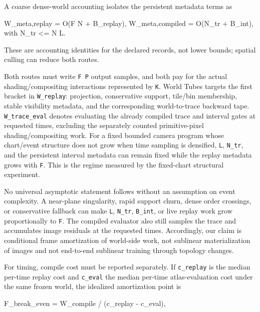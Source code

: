 \documentclass[
]{article}
\newenvironment{Shaded}{}{}
\newcommand{\NormalTok}[1]{#1}
\begin{document}
A coarse dense-world accounting isolates the persistent metadata terms
as

\begin{Shaded}
\begin{Highlighting}[]
\NormalTok{W\_meta,replay   = O(F N + B\_replay),}
\NormalTok{W\_meta,compiled = O(N\_tr + B\_int),       with N\_tr \textless{}= N L.}
\end{Highlighting}
\end{Shaded}

These are accounting identities for the declared records, not lower
bounds; spatial culling can reduce both routes.

Both routes must write \texttt{F\ P} output samples, and both pay for
the actual shading/compositing interactions represented by \texttt{K}.
World Tubes targets the first bracket in \texttt{W\_replay}: projection,
conservative support, tile/bin membership, stable visibility metadata,
and the corresponding world-to-trace backward tape.
\texttt{W\_trace\_eval} denotes evaluating the already compiled trace
and interval gates at requested times, excluding the separately counted
primitive-pixel shading/compositing work. For a fixed bounded camera
program whose chart/event structure does not grow when time sampling is
densified, \texttt{L}, \texttt{N\_tr}, and the persistent interval
metadata can remain fixed while the replay metadata grows with
\texttt{F}. This is the regime measured by the fixed-chart structural
experiment.

No universal asymptotic statement follows without an assumption on event
complexity. A near-plane singularity, rapid support churn, dense order
crossings, or conservative fallback can make \texttt{L}, \texttt{N\_tr},
\texttt{B\_int}, or live replay work grow proportionally to \texttt{F}.
The compiled evaluator also still samples the trace and accumulates
image residuals at the requested times. Accordingly, our claim is
conditional frame amortization of world-side work, not sublinear
materialization of images and not end-to-end sublinear training through
topology changes.

For timing, compile cost must be reported separately. If
\texttt{c\_replay} is the median per-time replay cost and
\texttt{c\_eval} the median per-time atlas-evaluation cost under the
same frozen world, the idealized amortization point is

\begin{Shaded}
\begin{Highlighting}[]
\NormalTok{F\_break\_even = W\_compile / (c\_replay {-} c\_eval),}
\end{Highlighting}
\end{Shaded}
\end{document}
